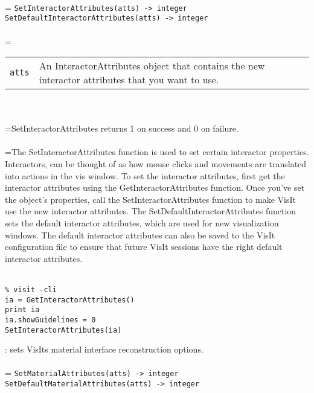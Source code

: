 \documentclass[10pt,a4paper]{report}
\begin{document}
 \\ 
\hangindent=\parindent 
\verb!SetInteractorAttributes(atts) -> integer!\\ 
\verb!SetDefaultInteractorAttributes(atts) -> integer!\\ [-3mm]

 \\ 
\hangindent=\parindent 
\begin{tabular}{lp{9cm}}
\verb!atts! & An InteractorAttributes object that contains the new interactor attributes that you want to use. \\
\end{tabular} \\[-2mm]


 \\ 
\hangindent=\parindent SetInteractorAttributes returns 1 on success and 0 on failure. \\[-3mm] 

 \\ 
\hangindent=\parindent The SetInteractorAttributes function is used to set certain interactor properties. Interactors, can be thought of as how mouse clicks and movements are translated into actions in the vis window. To set the interactor attributes, first get the interactor attributes using the GetInteractorAttributes function. Once you've set the object's properties, call the SetInteractorAttributes function to make VisIt use the new interactor attributes. The SetDefaultInteractorAttributes function sets the default interactor attributes, which are used for new visualization windows. The default interactor attributes can also be saved to the VisIt configuration file to ensure that future VisIt sessions have the right default interactor attributes. \\[-3mm] 

\\[-6mm]
\begin{verbatim}% visit -cli
ia = GetInteractorAttributes()
print ia
ia.showGuidelines = 0
SetInteractorAttributes(ia)
\end{verbatim}
\newpage


{}
: sets VisIts material interface reconstruction options.\\[-3mm]

 \\ 
\hangindent=\parindent 
\verb!SetMaterialAttributes(atts) -> integer!\\ 
\verb!SetDefaultMaterialAttributes(atts) -> integer!\\ [-3mm]
\end{document}
